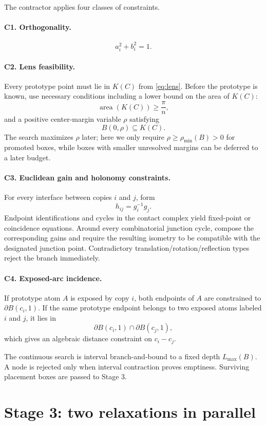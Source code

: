 \documentclass[11pt]{article}
\newcommand{\area}{\operatorname{area}}
\begin{document}
The contractor applies four classes of constraints.

\paragraph{C1. Orthogonality.}
\[
a_i^2+b_i^2=1.
\]

\paragraph{C2. Lens feasibility.}
Every prototype point must lie in $K(C)$ from \cref{eq:lens}. Before the prototype is known, use necessary conditions including a lower bound on the area of $K(C)$:
\[
\area(K(C))\ge \frac{\pi}{n},
\]
and a positive center-margin variable $\rho$ satisfying
\[
B(0,\rho)\subseteq K(C).
\]
The search maximizes $\rho$ later; here we only require $\rho\ge\rho_{\min}(B)>0$ for promoted boxes, while boxes with smaller unresolved margins can be deferred to a later budget.

\paragraph{C3. Euclidean gain and holonomy constraints.}
For every interface between copies $i$ and $j$, form
\[
h_{ij}=g_i^{-1}g_j.
\]
Endpoint identifications and cycles in the contact complex yield fixed-point or coincidence equations. Around every combinatorial junction cycle, compose the corresponding gains and require the resulting isometry to be compatible with the designated junction point. Contradictory translation/rotation/reflection types reject the branch immediately.

\paragraph{C4. Exposed-arc incidence.}
If prototype atom $A$ is exposed by copy $i$, both endpoints of $A$ are constrained to $\partial B(c_i,1)$. If the same prototype endpoint belongs to two exposed atoms labeled $i$ and $j$, it lies in
\[
\partial B(c_i,1)\cap\partial B(c_j,1),
\]
which gives an algebraic distance constraint on $c_i-c_j$.

The continuous search is interval branch-and-bound to a fixed depth $L_{\max}(B)$. A node is rejected only when interval contraction proves emptiness. Surviving placement boxes are passed to Stage 3.

\section{Stage 3: two relaxations in parallel}
\end{document}
